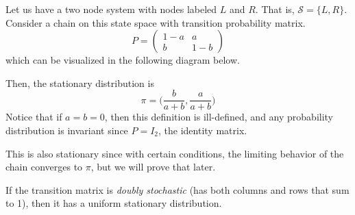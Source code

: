   \begin{example}
    \label{ex:a-two-state-chain}
    Let us have a two node system with nodes labeled $L$ and $R$. That is, $\mathcal{S} = \{L, R\}$. Consider a chain on this state space with transition probability matrix. 
    \begin{equation}
      P = \begin{pmatrix}
      1-a & a \\ b & 1-b 
      \end{pmatrix}
    \end{equation}
    which can be visualized in the following diagram below.
    \begin{center}
    \end{center}

    Then, the stationary distribution is 
    \begin{equation}
      \pi = \Big( \frac{b}{a+b}, \frac{a}{a+b} \Big)
    \end{equation}
    Notice that if $a = b = 0$, then this definition is ill-defined, and any probability distribution is invariant since $P = I_2$, the identity matrix. 
  \end{example}

	This is also stationary since with certain conditions, the limiting behavior of the chain converges to $\pi$, but we will prove that later. 

	\begin{theorem}
	  If the transition matrix is \textit{doubly stochastic} (has both columns and rows that sum to 1), then it has a uniform stationary distribution. 
	\end{theorem}

